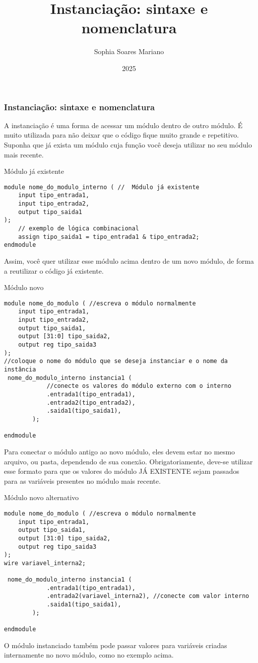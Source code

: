 \documentclass{beamer}
\title{Instanciação: sintaxe e nomenclatura}
\author{Sophia Soares Mariano}
\institute{Poliware}
\date{2025}
\begin{document}
\frame{\titlepage}

\begin{frame}
\frametitle{Instanciação: sintaxe e nomenclatura}
A instanciação é uma forma de acessar um módulo dentro de outro módulo. É muito utilizada para não deixar que o código fique muito grande e repetitivo.
\\
Suponha que já exista um módulo cuja função você deseja utilizar no seu módulo mais recente.
\end{frame}


\begin{frame}[fragile]{Módulo já existente}
\small
\begin{verbatim}
module nome_do_modulo_interno ( //  Módulo já existente
    input tipo_entrada1,
    input tipo_entrada2,
    output tipo_saida1
);
    // exemplo de lógica combinacional
    assign tipo_saida1 = tipo_entrada1 & tipo_entrada2; 
endmodule
\end{verbatim}
Assim, você quer utilizar esse módulo acima dentro de um novo módulo, de forma a reutilizar o código já existente.
\end{frame}

\begin{frame}[fragile]{Módulo novo}
\scriptsize
\begin{verbatim}
module nome_do_modulo ( //escreva o módulo normalmente
    input tipo_entrada1,
    input tipo_entrada2,
    output tipo_saida1, 
    output [31:0] tipo_saida2, 
    output reg tipo_saida3 
);
//coloque o nome do módulo que se deseja instanciar e o nome da instância
 nome_do_modulo_interno instancia1 ( 
            //conecte os valores do módulo externo com o interno
            .entrada1(tipo_entrada1), 
            .entrada2(tipo_entrada2), 
            .saida1(tipo_saida1),
        );

endmodule
\end{verbatim}
Para conectar o módulo antigo ao novo módulo, eles devem estar no mesmo arquivo, ou pasta, dependendo de sua conexão. Obrigatoriamente, deve-se utilizar esse formato para que os valores do módulo JÁ EXISTENTE sejam passados para as variáveis presentes no módulo mais recente.
\end{frame}

\begin{frame}[fragile]{Módulo novo alternativo}
\scriptsize
\begin{verbatim}
module nome_do_modulo ( //escreva o módulo normalmente
    input tipo_entrada1,
    output tipo_saida1, 
    output [31:0] tipo_saida2, 
    output reg tipo_saida3 
);
wire variavel_interna2;

 nome_do_modulo_interno instancia1 ( 
            .entrada1(tipo_entrada1), 
            .entrada2(variavel_interna2), //conecte com valor interno
            .saida1(tipo_saida1),
        );

endmodule
\end{verbatim}
O módulo instanciado também pode passar valores para variáveis criadas internamente no novo módulo, como no exemplo acima.
\end{frame}
\end{document}
